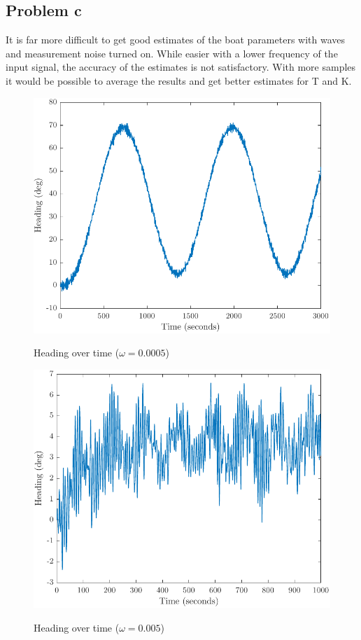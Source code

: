 \subsection{Problem c}
It is far more difficult to get good estimates of the boat parameters with waves and measurement noise
turned on. While easier with a lower frequency of the input signal, the accuracy of the estimates is not
satisfactory. With more samples it would be possible to average the results and get better estimates for
T and K. 

\begin{figure}[ht]
    \centering
    \begin{minipage}[b]{0.48\textwidth}
        \includegraphics[width=\textwidth]{"images/1c-omega_lik_0005"}
        \label{fig:1c-omega=0.0005}
        \caption{Heading over time ($\omega = 0.0005$)}
    \end{minipage}
    \hfill
    \begin{minipage}[b]{0.48\textwidth}
        \includegraphics[width=\textwidth]{"images/1c-omega_lik_005"}
        \label{fig:1c-omega=0.005}
        \caption{Heading over time ($\omega = 0.005$)}
    \end{minipage}
\end{figure}

